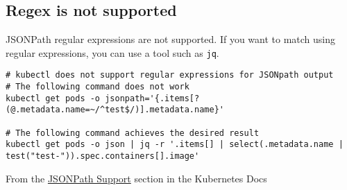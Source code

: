 \documentclass[a4paper,landscape]{article}
\begin{document}
\subsection{Regex is not supported}
\label{sec:org45f260a}

JSONPath regular expressions are not supported. If you want to match
using regular expressions, you can use a tool such as \texttt{jq}.

\begin{verbatim}
# kubectl does not support regular expressions for JSONpath output
# The following command does not work
kubectl get pods -o jsonpath='{.items[?(@.metadata.name=~/^test$/)].metadata.name}'

# The following command achieves the desired result
kubectl get pods -o json | jq -r '.items[] | select(.metadata.name | test("test-")).spec.containers[].image'
\end{verbatim}

From the \href{https://kubernetes.io/docs/reference/\_print/\#pg-a938176c695852fe70362c29cf615f1c}{JSONPath Support} section in the Kubernetes Docs
\end{document}
